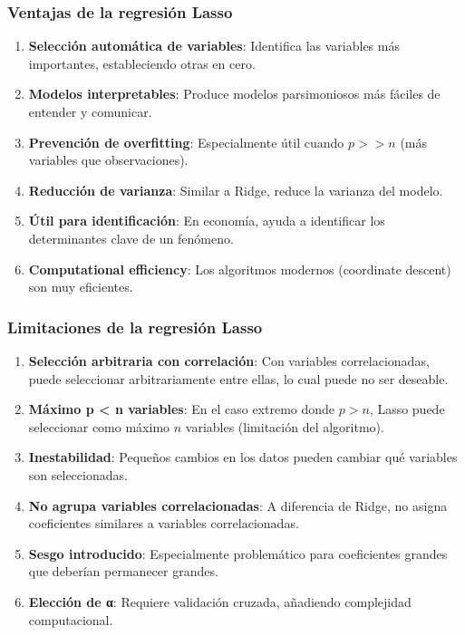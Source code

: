 \documentclass[
  doc,
  floatsintext,
  longtable,
  a4paper,
  nolmodern,
  notxfonts,
  notimes,
  12pt,
  colorlinks=true,linkcolor=blue,citecolor=blue,urlcolor=blue]{apa7}
\begin{document}
\subsubsection{Ventajas de la regresión
Lasso}\label{ventajas-de-la-regresiuxf3n-lasso}

\begin{enumerate}
\def\labelenumi{\arabic{enumi}.}
\item
  \textbf{Selección automática de variables}: Identifica las variables
  más importantes, estableciendo otras en cero.
\item
  \textbf{Modelos interpretables}: Produce modelos parsimoniosos más
  fáciles de entender y comunicar.
\item
  \textbf{Prevención de overfitting}: Especialmente útil cuando
  \(p >> n\) (más variables que observaciones).
\item
  \textbf{Reducción de varianza}: Similar a Ridge, reduce la varianza
  del modelo.
\item
  \textbf{Útil para identificación}: En economía, ayuda a identificar
  los determinantes clave de un fenómeno.
\item
  \textbf{Computational efficiency}: Los algoritmos modernos (coordinate
  descent) son muy eficientes.
\end{enumerate}

\subsubsection{Limitaciones de la regresión
Lasso}\label{limitaciones-de-la-regresiuxf3n-lasso}

\begin{enumerate}
\def\labelenumi{\arabic{enumi}.}
\item
  \textbf{Selección arbitraria con correlación}: Con variables
  correlacionadas, puede seleccionar arbitrariamente entre ellas, lo
  cual puede no ser deseable.
\item
  \textbf{Máximo p \textless{} n variables}: En el caso extremo donde
  \(p > n\), Lasso puede seleccionar como máximo \(n\) variables
  (limitación del algoritmo).
\item
  \textbf{Inestabilidad}: Pequeños cambios en los datos pueden cambiar
  qué variables son seleccionadas.
\item
  \textbf{No agrupa variables correlacionadas}: A diferencia de Ridge,
  no asigna coeficientes similares a variables correlacionadas.
\item
  \textbf{Sesgo introducido}: Especialmente problemático para
  coeficientes grandes que deberían permanecer grandes.
\item
  \textbf{Elección de α}: Requiere validación cruzada, añadiendo
  complejidad computacional.
\end{enumerate}
\end{document}
